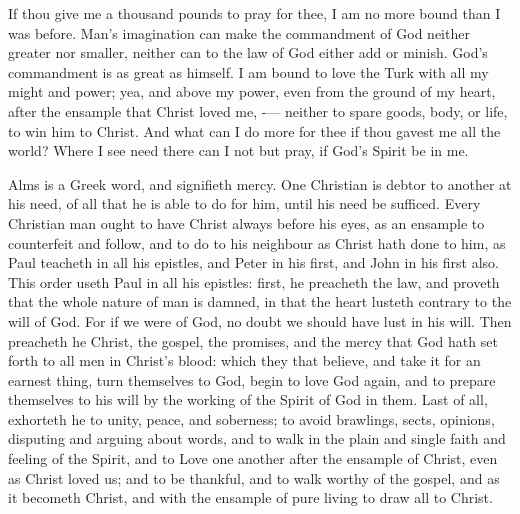 If thou give me a thousand pounds to pray for thee, I 
am no more bound than I was before. Man's imagination 
can make the commandment of God neither greater nor 
smaller, neither can to the law of God either add or 
minish. God's commandment is as great as himself. I am 
bound to love the Turk with all my might and power; yea, 
and above my power, even from the ground of my heart, after 
the ensample that Christ loved me, -— neither to spare goods, 
body, or life, to win him to Christ. And what can I do 
more for thee if thou gavest me all the world? Where I see 
need there can I not but pray, if God's Spirit be in me. 

Alms is a Greek word, and signifieth mercy. One 
Christian is debtor to another at his need, of all that he is 
able to do for him, until his need be sufficed. Every 
Christian man ought to have Christ always before his eyes, 
as an ensample to counterfeit and follow, and to do to his 
neighbour as Christ hath done to him, as Paul teacheth in 
all his epistles, and Peter in his first, and John in his first 
also. This order useth Paul in all his epistles: first, he 
preacheth the law, and proveth that the whole nature of 
man is damned, in that the heart lusteth contrary to the 
will of God. For if we were of God, no doubt we 
should have lust in his will. Then preacheth he Christ, 
the gospel, the promises, and the mercy that God hath set 
forth to all men in Christ's blood: which they that believe, 
and take it for an earnest thing, turn themselves to God, 
begin to love God again, and to prepare themselves to his 
will by the working of the Spirit of God in them. Last of all, 
exhorteth he to unity, peace, and soberness; to avoid brawlings,
sects, opinions, disputing and arguing about words, 
and to walk in the plain and single faith and feeling of the 
Spirit, and to Love one another after the ensample of 
Christ, even as Christ loved us; and to be thankful, and 
to walk worthy of the gospel, and as it becometh Christ, 
and with the ensample of pure living to draw all to Christ. 

